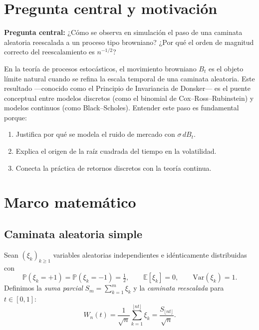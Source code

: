 \documentclass[12pt, a4paper]{article}
\newcommand{\E}{\mathbb{E}}
\newcommand{\Prob}{\mathbb{P}}
\newcommand{\Var}{\mathrm{Var}}
\begin{document}
\tableofcontents
\newpage

\section{Pregunta central y motivación}

\textbf{Pregunta central:} ¿Cómo se observa en simulación el paso de una
caminata aleatoria reescalada a un proceso tipo browniano? ¿Por qué el orden
de magnitud correcto del reescalamiento es $n^{-1/2}$?

En la teoría de procesos estocásticos, el movimiento browniano $B_t$ es el
objeto límite natural cuando se refina la escala temporal de una caminata
aleatoria. Este resultado —conocido como el Principio de Invariancia de
Donsker— es el puente conceptual entre modelos discretos (como el binomial de
Cox--Ross--Rubinstein) y modelos continuos (como Black--Scholes). Entender
este paso es fundamental porque:
\begin{enumerate}[noitemsep]
  \item Justifica por qué se modela el ruido de mercado con $\sigma \, dB_t$.
  \item Explica el origen de la raíz cuadrada del tiempo en la volatilidad.
  \item Conecta la práctica de retornos discretos con la teoría continua.
\end{enumerate}

\section{Marco matemático}

\subsection{Caminata aleatoria simple}

Sean $(\xi_k)_{k \ge 1}$ variables aleatorias independientes e idénticamente
distribuidas con
\[
  \Prob(\xi_k = +1) = \Prob(\xi_k = -1) = \tfrac{1}{2},
  \qquad \E[\xi_k] = 0, \qquad \Var(\xi_k) = 1.
\]
Definimos la \textit{suma parcial} $S_m = \sum_{k=1}^m \xi_k$ y la
\textit{caminata reescalada} para $t \in [0,1]$:
\begin{equation}
  W_n(t) = \frac{1}{\sqrt{n}} \sum_{k=1}^{\lfloor nt \rfloor} \xi_k
          = \frac{S_{\lfloor nt \rfloor}}{\sqrt{n}}.
  \label{eq:Wn}
\end{equation}
\end{document}

